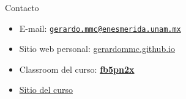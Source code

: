 \documentclass[
  11pt,
  ignorenonframetext,
]{beamer}
\begin{document}
\begin{frame}{Contacto}
\begin{itemize}
\item
  E-mail:
  \href{mailto:gerardo.mmc@enesmerida.unam.mx}{\nolinkurl{gerardo.mmc@enesmerida.unam.mx}}
\item
  Sitio web personal:
  \href{https://gerardommc.github.com}{gerardommc.github.io}
\item
  Classroom del curso:
  \href{https://classroom.google.com/c/NjE3NDQ4Njg5NDgz?cjc=fb5pn2x}{\textbf{fb5pn2x}}
\item
  \href{https://gerardommc.github.io/Ecologia-Teorica/}{Sitio del curso}
\end{itemize}
\end{frame}
\end{document}
